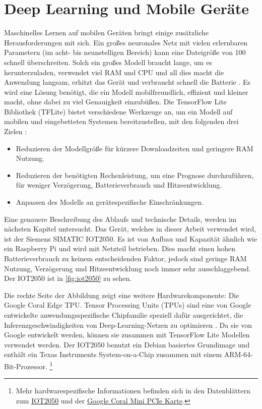 \section{Deep Learning und Mobile Geräte}
Maschinelles Lernen auf mobilen Geräten bringt einige
zusätzliche Herausforderungen mit sich.
Ein großes neuronales Netz mit vielen erlernbaren
Parametern (im acht- bis neunstelligen Bereich) kann eine Dateigröße von
\qty{100}{\mega\byte} schnell überschreiten.
Solch ein großes Modell braucht lange, um es herunterzuladen,
verwendet viel RAM und CPU und all dies macht die Anwendung langsam,
erhitzt das Gerät und verbraucht schnell die Batterie \parencite[685]{book:hands-on-ml}.
Es wird eine Lösung benötigt, die ein Modell mobilfreundlich,
effizient und kleiner macht, ohne dabei zu viel Genauigkeit einzubüßen.
Die TensorFlow Lite Bibliothek (TFLite)
bietet verschiedene Werkzeuge an, um ein Modell auf mobilen und eingebetteten
Systemen bereitzustellen, mit den folgenden drei Zielen \parencite[685]{book:hands-on-ml}:
\begin{itemize}
  \item Reduzieren der Modellgröße für kürzere Downloadzeiten und
        geringere RAM Nutzung.
  \item Reduzieren der benötigten Rechenleistung, um eine Prognose durchzuführen,
        für weniger Verzögerung, Batterieverbrauch und Hitzeentwicklung.
  \item Anpassen des Modells an gerätespezifische Einschränkungen.
\end{itemize}
Eine genauere Beschreibung des Ablaufs und technische Details, werden
im nächsten Kapitel untersucht.
Das Gerät, welches in dieser Arbeit verwendet wird, ist der Siemens SIMATIC
IOT2050. Es ist von Aufbau und Kapazität ähnlich wie ein Raspberry Pi
und wird mit Netzteil betrieben.
Dies macht einen hohen Batterieverbrauch zu keinem entscheidenden Faktor,
jedoch sind geringe RAM Nutzung, Verzögerung und Hitzeentwicklung
noch immer sehr ausschlaggebend.
Der IOT2050 ist in \autoref{fig:iot2050} zu sehen.
\newpage

\noindent
Die rechte Seite der Abbildung zeigt eine weitere Hardwarekomponente:
Die Google Coral Edge TPU. Tensor Processing Units (TPUs)
sind eine von Google entwickelte anwendungsspezifische Chipfamilie
speziell dafür ausgerichtet, die Inferenzgeschwindigkeiten
von Deep-Learning-Netzen zu optimieren \parencite{online:edge-tpu}.
Da sie von Google entwickelt werden, können sie zusammen
mit TensorFlow Lite Modellen verwendet werden. Der IOT2050 benutzt
ein Debian basiertes Grundimage und enthält ein
Texas Instruments System-on-a-Chip zusammen mit einem ARM-64-Bit-Prozessor.
\footnote{Mehr hardwarespezifische Informationen befinden sich in den Datenblättern zum
  \href{https://support.industry.siemens.com/cs/document/109779016/simatic-iot2050}{IOT2050}
  und der \href{https://coral.ai/docs/mini-pcie/datasheet/}{Google Coral Mini PCIe Karte}.}